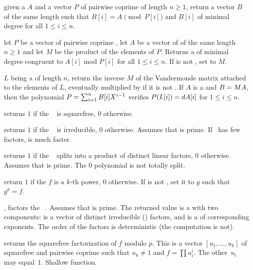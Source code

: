 given a  $A$ and a vector $P$ of pairwise coprime  of length
$n\ge 1$, return a vector $B$ of the same length such that $B[i] =
A\pmod{P[i]}$ and $B[i]$ of minimal degree for all $1\leq i\leq n$.

let $P$ be a vector of pairwise coprime , let $A$ be a vector of
 of the same length $n\ge 1$ and let $M$ be the product of the
elements of $P$. Returns a  of minimal degree congruent to $A[i]$ mod
$P[i]$ for all $1\leq i\leq n$.
If  is not , set  to $M$.

 $L$ being a 
of length $n$, return the inverse $M$ of the Vandermonde matrix attached to
the elements of $L$, eventually multiplied by  if it is not
. If $A$ is a  and $B=M\*A$, then the polynomial
$P=\sum_{i=1}^n B[i]\*X^{i-1}$ verifies $P(L[i])=d\*A[i]$ for
$1 \leq i \leq n$.

 returns $1$ if the
~ is squarefree, $0$ otherwise.

 returns $1$ if the ~
is irreducible, $0$ otherwise. Assumes that  is prime. If~ has
few factors,  is much faster.

 returns $1$ if the
~ splits into a product of distinct linear factors, $0$
otherwise. Assumes that  is prime. The $0$ polynomial is not
totally split.

return $1$ if the  $f$ is a $k$-th power, $0$ otherwise.
If  is not , set it to $g$ such that $g^k = f$.

, factors the ~. Assumes
that  is prime. The returned value  is a  with two
components:  is a vector of distinct irreducible ()
factors, and  is a  of corresponding exponents. The
order of the factors is deterministic (the computation is not).

 returns the squarefree
factorization of $f$ modulo $p$. This is a vector $[u_1,\dots,u_k]$
of squarefree and pairwise coprime  such that $u_k \neq 1$ and $f =
\prod u_i^i$. The other~$u_i$ may equal~$1$.
Shallow function.

